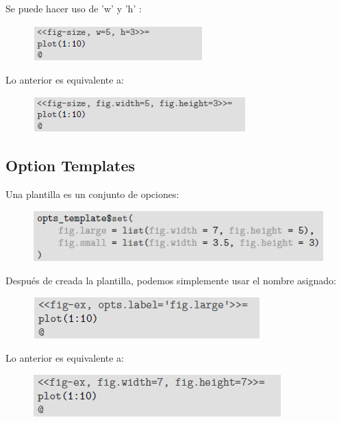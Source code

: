 \documentclass[10pt]{article}   			%
\begin{document}
Se puede hacer uso de 'w' y 'h' :

\begin{figure}[ht] 
	\centering
		\includegraphics[scale=2]{Aliases2} 
		\label{fig:Aliases2}
\end{figure}

Lo anterior es equivalente a:

\begin{figure}[ht] 
	\centering
		\includegraphics[scale=1.6]{Aliases3} 
		\label{fig:Aliases3}
\end{figure}

\newpage 
\subsection{Option Templates}

Una plantilla es un conjunto de opciones:
		
\begin{figure}[ht] 
	\centering
		\includegraphics[scale=0.8]{Templates1}
		\label{fig:Templates1}
\end{figure}

Después de creada la plantilla, podemos simplemente usar el nombre asignado:

\begin{figure}[ht] 
	\centering
		\includegraphics[scale=1.2]{Templates2} 
		\label{fig:Templates2}
\end{figure}

Lo anterior es equivalente a:

\begin{figure}[ht] 
	\centering
		\includegraphics[scale=1.1]{Templates3} 
		\label{fig:Templates3}
\end{figure}
\end{document}
